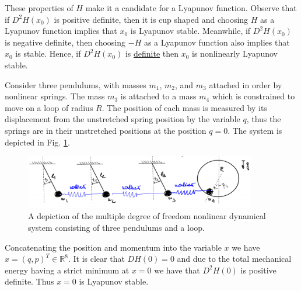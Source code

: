 These properties of $H$ make it a candidate for a Lyapunov function. Observe that if $D^{2}H(x_0)$ is positive definite, then it is cup shaped and choosing $H$ as a Lyapunov function implies that $x_0$ is Lyapunov stable. Meanwhile, if $D^{2}H(x_0)$ is negative definite, then choosing $-H$ as a Lyapunov function also implies that $x_0$ is stable. Hence, if $D^2H(x_0)$ is \underline{definite} then $x_0$ is nonlinearly Lyapunov stable.

\begin{ex}
	Consider three pendulums, with masses $m_1$, $m_2$, and $m_3$ attached in order by nonlinear springs. The mass $m_3$ is attached to a mass $m_4$ which is constrained to move on a loop of radius $R$. The position of each mass is measured by its displacement from the unstretched spring position by the variable $q$, thus the springs are in their unstretched positions at the position $q=0$. The system is depicted in Fig. \ref{fig:multi_dof_mech}.
\begin{figure}[h!]
	\centering
	\includegraphics[width=0.9\textwidth]{figures/ch8/17multi_dof_mech.png}
	\caption{A depiction of the multiple degree of freedom nonlinear dynamical system consisting of three pendulums and a loop.}
	\label{fig:multi_dof_mech}
\end{figure}

Concatenating the position and momentum into the variable $x$ we have $x=(q,p)^{T}\in \mathbb{R}^{8}$. It is clear that $DH(0) = 0$ and due to the total mechanical energy having a strict minimum at $x=0$ we have that $D^2H(0)$ is positive definite. Thus $x=0$ is Lyapunov stable.
\end{ex}


